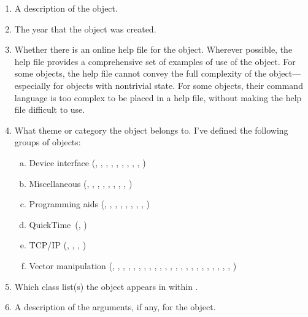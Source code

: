 \begin{enumerate}[  1)]
\item A description of the object.
\item The year that the object was created.
\item Whether there is an online help file for the object.
Wherever possible, the help file provides a comprehensive set of examples of use of the object.
For some objects, the help file cannot convey the full complexity of the object---especially for objects with nontrivial state.
For some objects, their command language is too complex to be placed in a help file, without making the help file difficult to use.
\item What theme or category the object belongs to.
I've defined the following groups of objects:
  \begin{enumerate}[a)]
  \item Device interface (, , , , , ,
    , , , )
  \item Miscellaneous (, , , , ,
    , , , )
  \item Programming aids (, , , , ,
    , , , )
  \item QuickTime\texttrademark\ (, )
  \item TCP/IP (, , , )
  \item Vector manipulation (, , , , ,
    , , , , , , ,
    , , , , , ,
    , , , , , )
  \end{enumerate}
\item Which class list(s) the object appears in within \MaxName.
\item A description of the arguments, if any, for the object.

\end{enumerate}
